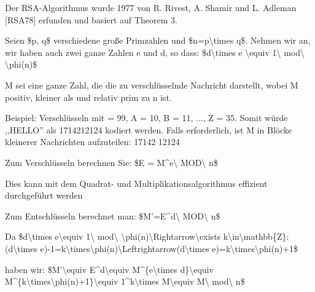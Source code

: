 \documentclass[a4paper]{article}
\begin{document}
\begin{multicols}{3}
      \begin{itemize*}
            \item Der RSA-Algorithmus wurde 1977 von R. Rivest, A. Shamir und L. Adleman
            {[}RSA78{]} erfunden und basiert auf Theorem 3.
            \item Seien \$p, q\$ verschiedene große Primzahlen und
            \$n=p\textbackslash times q\$. Nehmen wir an, wir haben auch zwei
            ganze Zahlen e und d, so dass: \$d\textbackslash times e
            \textbackslash equiv 1\textbackslash{} mod\textbackslash{}
            \textbackslash phi(n)\$
            \item M sei eine ganze Zahl, die die zu verschlüsselnde Nachricht darstellt,
            wobei M positiv, kleiner als und relativ prim zu n ist.
            \begin{itemize*}
                  \item Beispiel: Verschlüsseln mit = 99, A = 10, B = 11, ..., Z = 35. Somit würde ,,HELLO'' als 1714212124 kodiert werden. Falls erforderlich, ist M in Blöcke kleinerer Nachrichten aufzuteilen: 17142 12124
            \end{itemize*}
            \item Zum Verschlüsseln berechnen Sie: \$E = M\^{}e\textbackslash{}
            MOD\textbackslash{} n\$
            \begin{itemize*}
                  \item Dies kann mit dem Quadrat- und Multiplikationsalgorithmus effizient durchgeführt werden
            \end{itemize*}
            \item Zum Entschlüsseln berechnet man: \$M'=E\^{}d\textbackslash{}
            MOD\textbackslash{} n\$
            \begin{itemize*}
                  \item Da \$d\textbackslash times e\textbackslash equiv 1\textbackslash{} mod\textbackslash{} \textbackslash phi(n)\textbackslash Rightarrow\textbackslash exists k\textbackslash in\textbackslash mathbb\{Z\}:(d\textbackslash times e)-1=k\textbackslash times\textbackslash phi(n)\textbackslash Leftrightarrow(d\textbackslash times e)=k\textbackslash times\textbackslash phi(n)+1\$
                  \item haben wir: \$M'\textbackslash equiv E\^{}d\textbackslash equiv M\^{}\{e\textbackslash times d\}\textbackslash equiv M\^{}\{k\textbackslash times\textbackslash phi(n)+1\}\textbackslash equiv 1\^{}k\textbackslash times M\textbackslash equiv M\textbackslash{} mod\textbackslash{} n\$

\end{itemize*}
\end{itemize*}
\end{multicols}
\end{document}

